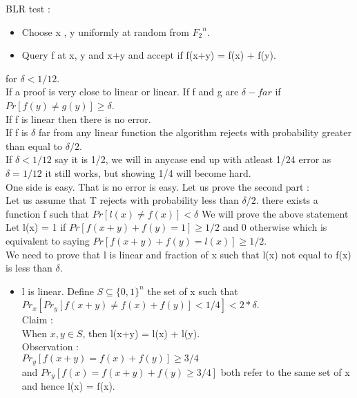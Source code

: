 \documentclass[solution,addpoints,12pt]{exam}
\begin{document}
\begin{parts}
\begin{itemize}
BLR test :\\
\begin{itemize}
\item
Choose x , y uniformly at random from ${F_2}^n$.
\item
Query f at x, y and x+y and accept if f(x+y) = f(x) + f(y).\\
\end{itemize}

for $\delta < 1/12$.\\
If a proof is very close to linear or linear. If f and g are
$\delta-far$ if $Pr[f(y) \ne g(y)] \ge \delta$.\\
If f is linear then there is no error.\\
If f is $\delta$ far from any linear function the algorithm
rejects with probability greater than equal to $\delta/2$.\\

If $\delta < 1/12$ say it is 1/2, we will in anycase end up with atleast
1/24 error as $\delta = 1/12$ it still works, but showing 1/4 will
become hard.\\

One side is easy. That is no error is easy.
Let us prove the second part :\\
Let us assume that T rejects with probability less than $\delta/2$.
there exists a function f such that $Pr[l(x) \ne f(x)] < \delta$
We will prove the above statement\\
Let l(x) = 1 if $Pr[f(x+y) + f(y) = 1] \ge 1/2$ and
0 otherwise which is equivalent to saying
$Pr[f(x+y) + f(y) = l(x)] \ge 1/2$.\\
We need to prove that l is linear and fraction of x
such that l(x) not equal to f(x) is less than $\delta$.\\
\begin{itemize}
\item l is linear.
Define $S \subseteq {\{0, 1\}}^n$ the set of x such that
$Pr_x[Pr_y[f(x+y) \ne f(x) + f(y)] < 1/4] < 2*\delta$.\\
Claim :\\
When $x, y \in S$, then l(x+y) = l(x) + l(y).\\
Observation :\\
$Pr_y[f(x+y) = f(x) + f(y)] \ge 3/4$\\
and $Pr_y[f(x) = f(x+y) + f(y) \ge 3/4]$ both refer
to the same set of x and hence l(x) = f(x).\\


\end{itemize}
\end{itemize}
\end{parts}
\end{document}
